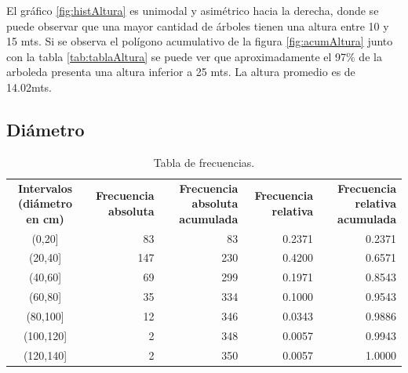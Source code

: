 \documentclass[11pt]{article}
\begin{document}
\begin{justify}
  El gráfico \ref{fig:histAltura} es unimodal y asimétrico hacia la derecha,
  donde se puede observar
  que una mayor cantidad de árboles tienen una altura entre 10 y 15 mts.
  Si se observa el polígono acumulativo de la figura \ref{fig:acumAltura} 
  junto con la tabla \ref{tab:tablaAltura} se puede ver que aproximadamente
  el 97\% de la arboleda presenta una altura inferior a 25 mts.
  La altura promedio es de 14.02mts.
\end{justify}


\subsection{Diámetro}

\begin{table}[h!]
  \begin{center}
    \begin{tabular}{| c | r | r | r | r |}
      \hline
      \multirow{3}{3cm}{\centering\textbf{Intervalos (diámetro en cm)}} & 
      \multirow{3}{3cm}{\centering\textbf{Frecuencia absoluta}} & 
      \multirow{3}{3cm}{\centering\textbf{Frecuencia absoluta acumulada}} &
      \multirow{3}{3cm}{\centering\textbf{Frecuencia relativa}} & 
      \multirow{3}{3cm}{\centering\textbf{Frecuencia relativa acumulada}} \\
      & & & & \\
      & & & & \\ \hline
      (0,20] & 83 & 83 & 0.2371 & 0.2371 \\ \hline
      (20,40] & 147 & 230 & 0.4200 & 0.6571 \\ \hline
      (40,60] & 69 & 299 & 0.1971 & 0.8543 \\ \hline
      (60,80] & 35 & 334 & 0.1000 & 0.9543 \\ \hline
      (80,100] & 12 & 346 & 0.0343 & 0.9886 \\ \hline
      (100,120] & 2 & 348 & 0.0057 & 0.9943 \\ \hline
      (120,140] & 2 & 350 & 0.0057 & 1.0000 \\ \hline
    \end{tabular}
    \caption{Tabla de frecuencias.}
    \label{tab:tablaDiametro}
  \end{center}
\end{table}

\newpage
\end{document}
